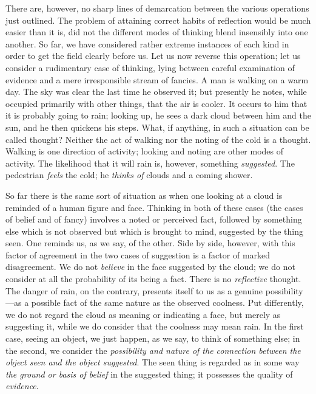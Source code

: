 \documentclass[showtrims,ustradepaper]{memoir}
\begin{document}
There are, however, no sharp lines of demarcation between the various
operations just outlined. The problem of attaining correct habits of
reflection would be much easier than it is, did not the different modes
of thinking blend insensibly into one another. So far, we have
considered rather extreme instances of each kind in order to get the
field clearly before us. Let us now reverse this operation; let us
consider a rudimentary case of thinking, lying between careful
examination of evidence and a mere irresponsible stream of fancies. A
man is walking on a warm day. The sky was clear the last time he
observed it; but presently he notes, while occupied primarily with other
things, that the air is cooler. It occurs to him that it is probably
going
to
rain; looking up, he sees a dark cloud between him and the sun, and he
then quickens his steps. What, if anything, in such a situation can be
called thought? Neither the act of walking nor the noting of the cold is
a thought. Walking is one direction of activity; looking and noting are
other modes of activity. The likelihood that it will rain is, however,
something \emph{suggested}. The pedestrian \emph{feels} the cold; he
\emph{thinks of} clouds and a coming shower.



So far there is the same sort of situation as when one looking at a
cloud is reminded of a human figure and face. Thinking in both of these
cases (the cases of belief and of fancy) involves a noted or perceived
fact, followed by something else which is not observed but which is
brought to mind, suggested by the thing seen. One reminds us, as we say,
of the other. Side by side, however, with this factor of agreement in
the two cases of suggestion is a factor of marked disagreement. We do
not \emph{believe} in the face suggested by the cloud; we do not
consider at all the probability of its being a fact. There is no
\emph{reflective} thought. The danger of rain, on the contrary, presents
itself to us as a genuine possibility---as a possible fact of the same
nature as the observed coolness. Put differently, we do not regard the
cloud as meaning or indicating a face, but merely as suggesting it,
while we do consider that the coolness may mean rain. In the first case,
seeing an object, we just happen, as we say, to think of something else;
in the second, we consider the \emph{possibility and nature of the
connection between the object seen and the object suggested}. The seen
thing is regarded as in some way \emph{the ground or basis of belief} in
the suggested thing; it possesses the quality of
\emph{evidence}.
\end{document}
